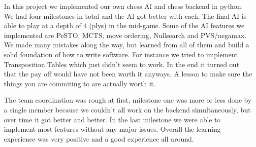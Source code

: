 In this project we implemented our own chess AI and chess backend
in python. We had four milestones in total and the AI
got better with each. The final AI is able to play at a depth of 4 (plys)
in the mid-game. Some of the AI features we implemented are PeSTO,
MCTS, move ordering, Nullsearch and PVS/negamax.
We made many mistakes along the way, but learned from all
of them and build a solid foundation of how to write software.
For instance we tried to implement Transposition Tables which
just didn't seem to work. In the end it turned out that the
pay off would have not been worth it anyways.
A lesson to make sure the things you are commiting to are actually
worth it.

The team coordination was rough at first,
milestone one was more or less done by a single member
because we couldn't all work on the backend simultaneously,
but over time it got better and better. In the last milestone
we were able to implement most features without any major
issues. Overall the learning experience was very positive
and a good experience all around.
